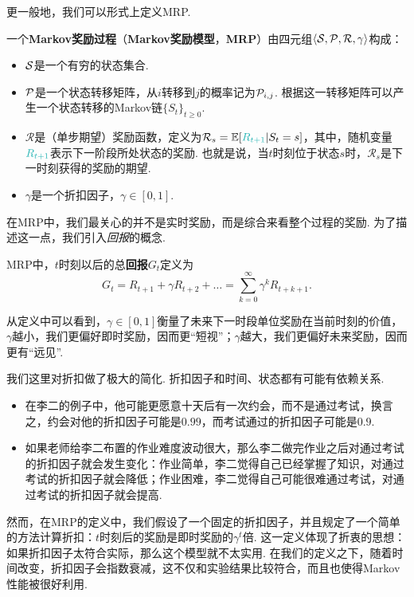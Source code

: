 更一般地，我们可以形式上定义MRP.

\begin{definition}
一个\textbf{Markov奖励过程}（\textbf{Markov奖励模型}，\textbf{MRP}）由四元组$\langle\mathcal S,\mathcal P,\mathcal R,\gamma\rangle$构成：
\begin{itemize}
    \item $\mathcal S$是一个有穷的状态集合.
    \item $\mathcal P$是一个状态转移矩阵，从$i$转移到$j$的概率记为$\mathcal P_{i,j}$. 根据这一转移矩阵可以产生一个状态转移的Markov链$\{S_t\}_{t\geq 0}$.
    \item $\mathcal R$是（单步期望）奖励函数，定义为$\mathcal R_s = \E[\contrastlight{R_{t+1}}|S_t=s]$，其中，随机变量$\contrastlight{R_{t+1}}$表示下一阶段所处状态的奖励. 也就是说，当$t$时刻位于状态$s$时，$\mathcal R_s$是下一时刻获得的奖励的期望.
    \item $\gamma$是一个折扣因子，$\gamma\in[0,1]$.
\end{itemize}
\end{definition}

在MRP中，我们最关心的并不是实时奖励，而是综合来看整个过程的奖励. 为了描述这一点，我们引入\emph{回报}的概念.

\begin{definition}[回报]
MRP中，$t$时刻以后的总\textbf{回报}$G_t$定义为
    \[G_t = R_{t+1}+\gamma R_{t+2} +\dots =\sum_{k=0}^\infty \gamma^kR_{t+k+1}.\]    
\end{definition}
从定义中可以看到，$\gamma \in[0,1]$衡量了未来下一时段单位奖励在当前时刻的价值，$\gamma$越小，我们更偏好即时奖励，因而更“短视”；$\gamma$越大，我们更偏好未来奖励，因而更有“远见”.

我们这里对折扣做了极大的简化. 折扣因子和时间、状态都有可能有依赖关系. 
\begin{itemize}
    \item 在李二的例子中，他可能更愿意十天后有一次约会，而不是通过考试，换言之，约会对他的折扣因子可能是$0.99$，而考试通过的折扣因子可能是$0.9$.
    \item 如果老师给李二布置的作业难度波动很大，那么李二做完作业之后对通过考试的折扣因子就会发生变化：作业简单，李二觉得自己已经掌握了知识，对通过考试的折扣因子就会降低；作业困难，李二觉得自己可能很难通过考试，对通过考试的折扣因子就会提高.
\end{itemize}
然而，在MRP的定义中，我们假设了一个固定的折扣因子，并且规定了一个简单的方法计算折扣：$t$时刻后的奖励是即时奖励的$\gamma^t$倍. 这一定义体现了折衷的思想：如果折扣因子太符合实际，那么这个模型就不太实用. 在我们的定义之下，随着时间改变，折扣因子会指数衰减，这不仅和实验结果比较符合，而且也使得Markov性能被很好利用.

